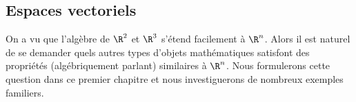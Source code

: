 % 
%
%

\begin{partbacktext}
\part{Espaces vectoriels}
\noindent  
On a vu que l'algèbre de $\R^2$ et $\R^3$ s'étend facilement à $\R^n$. Alors il est naturel de se demander quels autres types d'objets mathématiques satisfont des propri\'et\'es (algébriquement parlant) similaires à $\R^n$.   Nous formulerons cette question dans ce premier 
chapitre et nous investiguerons de nombreux exemples familiers.

\end{partbacktext}
